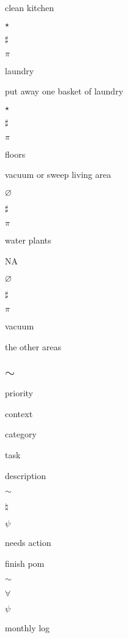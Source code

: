 \documentclass[]{book}
\newenvironment{Shaded}{\begin{snugshade}}{\end{snugshade}}
\newcommand{\KeywordTok}[1]{\textcolor[rgb]{0.13,0.29,0.53}{\textbf{#1}}}
\newcommand{\NormalTok}[1]{#1}
\newcommand{\OperatorTok}[1]{\textcolor[rgb]{0.81,0.36,0.00}{\textbf{#1}}}
\newcommand{\StringTok}[1]{\textcolor[rgb]{0.31,0.60,0.02}{#1}}
\begin{document}
clean kitchen

\(\star\)

\(\sharp\)

\(\pi\)

laundry

put away one basket of laundry

\(\star\)

\(\sharp\)

\(\pi\)

floors

vacuum or sweep living area

\(\varnothing\)

\(\sharp\)

\(\pi\)

water plants

NA

\(\varnothing\)

\(\sharp\)

\(\pi\)

vacuum

the other areas

\hypertarget{sim}{%
\subsection{\texorpdfstring{\(\sim\)}{\textbackslash{}sim}}\label{sim}}

\begin{Shaded}
\end{Shaded}

priority

context

category

task

description

\(\sim\)

\(\natural\)

\(\psi\)

needs action

finish pom

\(\sim\)

\(\forall\)

\(\psi\)

monthly log
\end{document}
